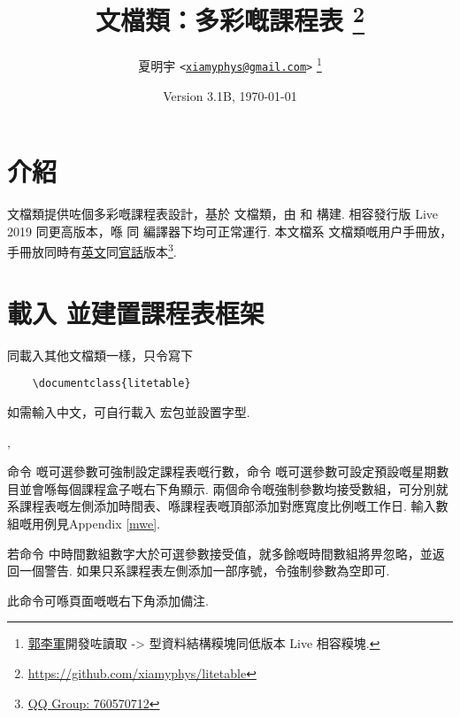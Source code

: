 \documentclass[letterpaper]{l3doc}
\title
{
  \bfseries\cls{litetable} 文檔類：多彩嘅課程表
  \footnote{\url{https://github.com/xiamyphys/litetable}}
}
\author
{
  夏明宇 \texttt{<\href{mailto:xiamyphys@gmail.com}{xiamyphys@gmail.com}>}
  \thanks{\href{https://github.com/ljguo1020}{郭李軍}開發咗讀取 \meta{left} -> \meta{right} 型資料結構糢塊同低版本 \hologo{TeX} Live 相容糢塊.}
}
\date{Version 3.1B, \today}
\begin{document}
\maketitle

\section{介紹}

 文檔類提供咗個多彩嘅課程表設計，基於  文檔類，由  和  構建. 相容發行版  Live 2019 同更高版本，喺  同  編譯器下均可正常運行. 本文檔系  文檔類嘅用户手冊放，手冊放同時有\href{./litetable-en.pdf}{英文}同\href{./litetable-cn.pdf}{官話}版本\footnote{\href{https://qm.qq.com/q/RyssAhG4qy}{QQ Group: 760570712}}.

\section{載入  並建置課程表框架}

同載入其他文檔類一樣，只令寫下

\begin{framed}
  \begin{verbatim}
    \documentclass{litetable}
  \end{verbatim}
\end{framed}

如需輸入中文，可自行載入  宏包並設置字型.

\begin{function}{\timelist,\weeklist}
  \begin{syntax}
                 
        
  \end{syntax}

  命令  嘅可選參數可強制設定課程表嘅行數，命令  嘅可選參數可設定預設嘅星期數目並會喺每個課程盒子嘅右下角顯示. 兩個命令嘅強制參數均接受數組，可分別就系課程表嘅左側添加時間表、喺課程表嘅頂部添加對應寬度比例嘅工作日. 輸入數組嘅用例見Appendix \ref{mwe}.
  
  若命令  中時間數組數字大於可選參數接受值，就多餘嘅時間數組將畀忽略，並返回一個警告. 如果只系課程表左側添加一部序號，令強制參數為空即可.
\end{function}

\begin{function}{\more}
  \begin{syntax}
  \end{syntax}

  此命令可喺頁面嘅嘅右下角添加備注.
\end{function}
\end{document}
